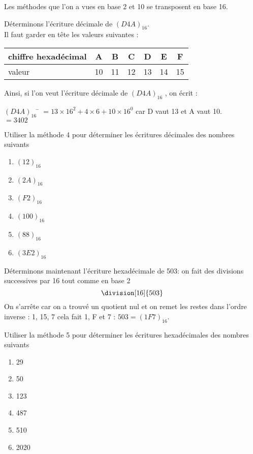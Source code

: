 \documentclass[a4paper,12pt,french]{book}
\begin{document}
Les méthodes que l'on a vues en base 2 et 10 se transposent en base 16.
\begin{methode}
Déterminons l'écriture décimale de $(D4A)_{16}$.\\ Il faut garder en tête les valeurs suivantes :
\begin{center}
\begin{tabular}{|l|c|c|c|c|c|c|}
\hline 
chiffre hexadécimal & A & B & C & D & E & F \\ 
\hline 
valeur  & 10 & 11 & 12 & 13 & 14 & 15 \\ 
\hline 
\end{tabular} 
\end{center}
Ainsi, si l'on veut l'écriture décimale de 	$(D4A)_{16}$ , on écrit :
\begin{tabbing}
	$(D4A)_{16}$  	\= $=13\times 16^2 + 4\times 6 + 10\times 16^0$	 car D vaut 13 et A vaut 10.\\
		\>	$=3402$
\end{tabbing}
\end{methode}

\begin{exercice}[]
	Utiliser la méthode 4 pour déterminer les écritures décimales des nombres suivants
	\begin{multicols}{3}
		\begin{enumerate}[\bfseries 1.]
			\item 	$(12)_{16}$
			\item 	$(2A)_{16}$
			\item 	$(F2)_{16}$
			\item 	$(100)_{16}$
			\item	$(88)_{16}$
			\item 	$(3E2)_{16}$
		\end{enumerate}
	\end{multicols}
\end{exercice}
\begin{methode}
Déterminons maintenant l'écriture hexadécimale de 503: on fait des divisions successives par 16 tout comme en base 2
$$\division[16]{503}$$
On s'arrête car on a trouvé un quotient nul et on remet les restes dans l'ordre inverse : 1, 15, 7 cela fait 1, F et 7 : $503=(1F7)_{16}$.
\end{methode}
\begin{exercice}[]
	Utiliser la méthode 5 pour déterminer les écritures hexadécimales des nombres suivants
	\begin{multicols}{3}
		\begin{enumerate}[\bfseries 1.]
			\item 	29
			\item 	50
			\item 	123
			\item 	487
			\item	510
			\item 	2020
		\end{enumerate}
	\end{multicols}
\end{exercice}
\end{document}
